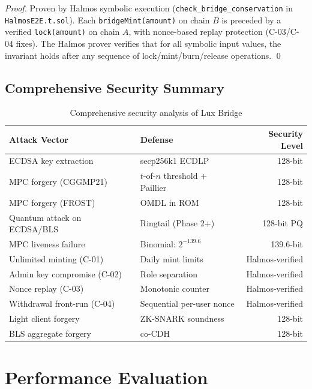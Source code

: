 \documentclass[11pt]{article}
\begin{document}
\begin{proof}
Proven by Halmos symbolic execution (\texttt{check\_bridge\_conservation} in \texttt{HalmosE2E.t.sol}). Each \texttt{bridgeMint(amount)} on chain $B$ is preceded by a verified \texttt{lock(amount)} on chain $A$, with nonce-based replay protection (C-03/C-04 fixes). The Halmos prover verifies that for all symbolic input values, the invariant holds after any sequence of lock/mint/burn/release operations. \qed
\end{proof}

\subsection{Comprehensive Security Summary}

\begin{table}[h]
\centering
\begin{tabular}{llr}
\toprule
\textbf{Attack Vector} & \textbf{Defense} & \textbf{Security Level} \\
\midrule
ECDSA key extraction & secp256k1 ECDLP & 128-bit \\
MPC forgery (CGGMP21) & $t$-of-$n$ threshold + Paillier & 128-bit \\
MPC forgery (FROST) & OMDL in ROM & 128-bit \\
Quantum attack on ECDSA/BLS & Ringtail (Phase 2+) & 128-bit PQ \\
MPC liveness failure & Binomial: $2^{-139.6}$ & 139.6-bit \\
Unlimited minting (C-01) & Daily mint limits & Halmos-verified \\
Admin key compromise (C-02) & Role separation & Halmos-verified \\
Nonce replay (C-03) & Monotonic counter & Halmos-verified \\
Withdrawal front-run (C-04) & Sequential per-user nonce & Halmos-verified \\
Light client forgery & ZK-SNARK soundness & 128-bit \\
BLS aggregate forgery & co-CDH & 128-bit \\
\bottomrule
\end{tabular}
\caption{Comprehensive security analysis of Lux Bridge}
\end{table}

\section{Performance Evaluation}
\end{document}

